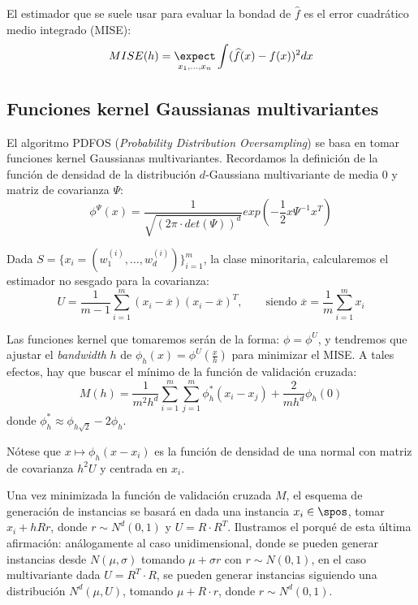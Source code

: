 El estimador que se suele usar para evaluar la bondad de $\widehat{f}$ es el error cuadrático medio integrado (MISE):
\[
  MISE(h) = \underset{x_1, \ldots, x_n}{\expect} \int (\widehat{f}(x) - f(x))^2 dx
\]



\subsection{Funciones kernel Gaussianas multivariantes}
El algoritmo PDFOS (\textit{Probability Distribution Oversampling}) se basa en tomar funciones kernel Gaussianas multivariantes.
Recordamos la definición de la función de densidad de la distribución $d$-Gaussiana multivariante de media 
$0$ y matriz de covarianza $\Psi$:
\[
  \phi^{\Psi}(x) = \frac{1}{\sqrt{(2\pi \cdot det(\Psi))^d}} exp\left(-\frac{1}{2} x \Psi^{-1} x^T \right)
\]

Dada $S = \{x_i = (w_1^{(i)}, \ldots, w_d^{(i)})\}_{i=1}^m$, la clase minoritaria, calcularemos el estimador no sesgado 
para la covarianza:
\[
  U = \frac{1}{m-1} \sum_{i=1}^m (x_i - \overline{x})(x_i - \overline{x})^T, 
  \qquad \textrm{siendo } \overline{x} = \frac{1}{m}\sum_{i=1}^m x_i
\]
  
Las funciones kernel que tomaremos serán de la forma: $\phi = \phi^{U}$, y tendremos que ajustar el \textit{bandwidth} $h$ de
$\phi_h(x) = \phi^U\left(\frac{x}{h}\right)$ para minimizar el MISE. A tales efectos, hay que buscar el mínimo de
la función de validación cruzada:
\begin{equation}
 M(h) = \frac{1}{m^2 h^d} \sum_{i=1}^m \sum_{j=1}^m \phi_h^{\ast} (x_i - x_j) + \frac{2}{m h^d} \phi_h(0)
 \label{eq:cross-val}
\end{equation}
donde $\phi_h^{\ast} \approx \phi_{h\sqrt{2}} - 2\phi_h$.

Nótese que $x\mapsto \phi_h(x-x_i)$ es la función de densidad de una normal con matriz de covarianza $h^2 U$ y centrada en $x_i$.

Una vez minimizada la función de validación cruzada $M$, el esquema de generación de instancias se basará en dada una instancia
$x_i \in \spos$, tomar $x_i + h R r$, donde $r\sim N^d(0,1)$ y $U = R\cdot R^T$. Ilustramos el porqué de esta última afirmación:
análogamente al caso unidimensional, donde se pueden generar instancias desde $N(\mu, \sigma)$ tomando $\mu + \sigma r$
con $r\sim N(0,1)$, en el caso multivariante dada $U =  R^T \cdot R$, se pueden generar instancias siguiendo una distribución $N^d(\mu, U)$,
tomando $\mu + R \cdot r$, donde $r\sim N^d(0,1)$.

